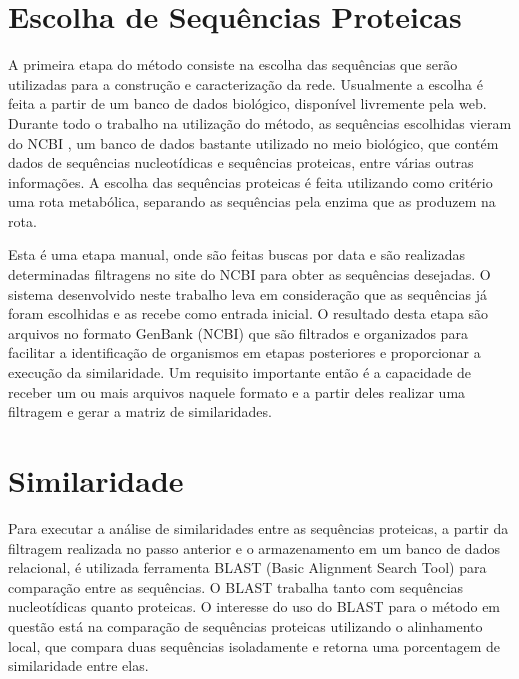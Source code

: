 \section{Escolha de Sequências Proteicas} \label{sec:escseq}

A primeira etapa do método consiste na escolha das sequências que serão utilizadas para a construção e caracterização da rede.
Usualmente a escolha é feita a partir de um banco de dados biológico, disponível livremente pela web. Durante todo o trabalho na utilização
do método, as sequências escolhidas vieram do NCBI \cite{ncbi}, um banco de dados bastante utilizado no meio biológico, que contém dados de sequências
nucleotídicas e sequências proteicas, entre várias outras informações. A escolha das sequências proteicas é feita utilizando como critério
uma rota metabólica, separando as sequências pela enzima que as produzem na rota.


Esta é uma etapa manual, onde são feitas buscas por data e são realizadas determinadas filtragens no site do NCBI para obter as sequências desejadas. O
sistema desenvolvido neste trabalho leva em consideração que as sequências já foram escolhidas e as recebe como entrada inicial. O resultado desta etapa
são arquivos no formato GenBank (NCBI) que são filtrados e organizados para facilitar a identificação de organismos em etapas posteriores e proporcionar
a execução da similaridade. Um requisito importante então é a capacidade de receber um ou mais arquivos naquele formato e a partir deles realizar uma
filtragem e gerar a matriz de similaridades.

\section{Similaridade} \label{sec:similaridade}

Para executar a análise de similaridades entre as sequências proteicas, a partir da filtragem realizada no passo anterior e o armazenamento em um banco
de dados relacional, é utilizada ferramenta BLAST (Basic Alignment Search Tool) \cite{blast1997} para comparação entre as sequências. O BLAST trabalha
tanto com sequências nucleotídicas quanto proteicas. O interesse do uso do BLAST para o método em questão está na comparação de sequências proteicas
utilizando o alinhamento local, que compara duas sequências isoladamente e retorna uma porcentagem de similaridade entre elas.

